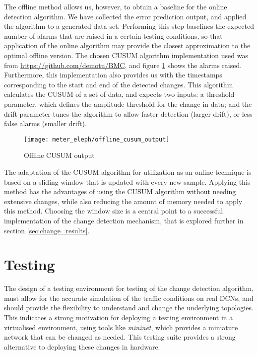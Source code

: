 \par The offline method allows us, however, to obtain a baseline for the online detection algorithm. We have collected the error prediction output, and applied the
algorithm to a generated data set. Performing this step baselines the expected number of alarms that are raised in a certain testing conditions, so that application
of the online algorithm may provide the closest approximation to the optimal offline version. The chosen CUSUM algorithm implementation used was from 
\url{https://github.com/demotu/BMC}, and  figure \ref{fig:offline_cusum} shows the alarms raised. Furthermore, this implementation also provides us with the
timestamps corresponding to the start and end of the detected changes. This algorithm calculates the CUSUM of a set of data, and expects two inputs:
a threshold parameter, which defines the amplitude threshold for the change in data; and the drift parameter tunes the algorithm to allow faster detection (larger 
drift), or less false alarms (smaller drift). 

\begin{figure} [H]
    \centering
    \texttt{[image: meter\_eleph/offline\_cusum\_output]}
    \caption {Offline CUSUM output}
    \label{fig:offline_cusum}
\end{figure} 

\par The adaptation of the CUSUM algorithm for utilization as an online technique is based on a sliding window that is updated with every new sample. Applying this
method has the advantages of using the CUSUM algorithm without needing extensive changes, while also reducing the amount of memory needed to apply this method. 
Choosing the window size is a central point to a successful implementation of the change detection mechanism, that is explored further in section 
\ref{sec:change_results}. 

\section {Testing}

The design of a testing environment for testing of the change detection algorithm, must allow for the accurate simulation of the traffic conditions on real DCNs,
and should provide the flexibility to understand and change the underlying topologies. This indicates a strong motivation for deploying a testing environment in a
virtualised environment, using tools like \textit{mininet}, which provides a miniature network that can be changed as needed. This testing suite provides a strong
alternative to deploying these changes in hardware.

